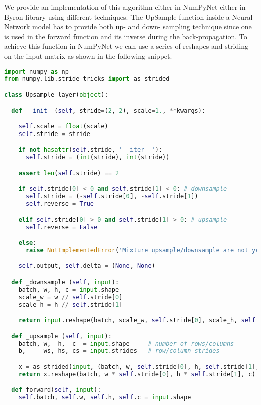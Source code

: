 \documentclass{standalone}
\begin{document}
We provide an implementation of this algorithm either in NumPyNet either in Byron library using different techniques.
The UpSample function inside a Neural Network model has to provide both up- and down- sampling technique since one is used in the forward function and its inverse during the back-propagation.
To achieve this function in NumPyNet we can use a series of reshapes and striding on the input matrix as shown in the following snippet.

\lstset{style=snippet}
\begin{lstlisting}[language=Python, caption=NumPyNet version of Upsampling function, label=code:py_dropout]
import numpy as np
from numpy.lib.stride_tricks import as_strided

class Upsample_layer(object):

  def __init__(self, stride=(2, 2), scale=1., **kwargs):

    self.scale = float(scale)
    self.stride = stride

    if not hasattr(self.stride, '__iter__'):
      self.stride = (int(stride), int(stride))

    assert len(self.stride) == 2

    if self.stride[0] < 0 and self.stride[1] < 0: # downsample
      self.stride = (-self.stride[0], -self.stride[1])
      self.reverse = True

    elif self.stride[0] > 0 and self.stride[1] > 0: # upsample
      self.reverse = False

    else:
      raise NotImplementedError('Mixture upsample/downsample are not yet implemented')

    self.output, self.delta = (None, None)

  def _downsample (self, input):
    batch, w, h, c = input.shape
    scale_w = w // self.stride[0]
    scale_h = h // self.stride[1]

    return input.reshape(batch, scale_w, self.stride[0], scale_h, self.stride[1], c).mean(axis=(2, 4))

  def _upsample (self, input):
    batch, w,  h,  c  = input.shape     # number of rows/columns
    b,     ws, hs, cs = input.strides   # row/column strides

    x = as_strided(input, (batch, w, self.stride[0], h, self.stride[1], c), (b, ws, 0, hs, 0, cs)) # view a as larger 4D array
    return x.reshape(batch, w * self.stride[0], h * self.stride[1], c)                                     # create new 2D array

  def forward(self, input):
    self.batch, self.w, self.h, self.c = input.shape


\end{lstlisting}
\end{document}
